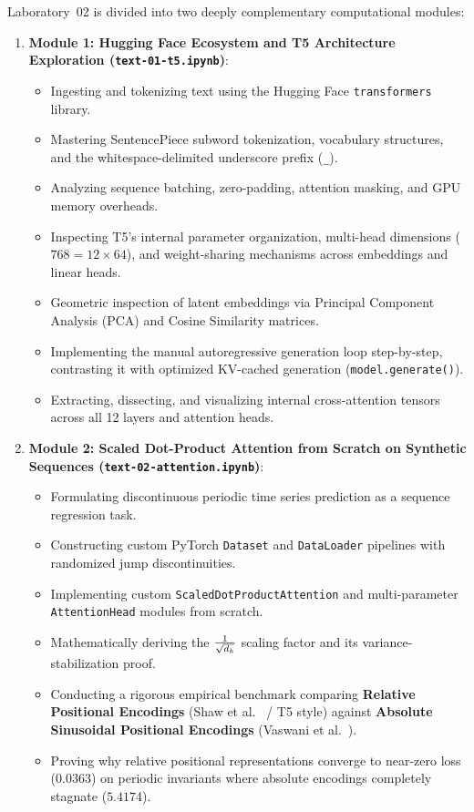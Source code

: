 \documentclass[../labs.tex]{subfiles}
\begin{document}
Laboratory~02 is divided into two deeply complementary computational modules:
\begin{enumerate}
    \item \textbf{Module 1: Hugging Face Ecosystem and T5 Architecture Exploration (\texttt{text-01-t5.ipynb})}:
    \begin{itemize}
        \item Ingesting and tokenizing text using the Hugging Face \texttt{transformers} library.
        \item Mastering SentencePiece subword tokenization, vocabulary structures, and the whitespace-delimited underscore prefix (\texttt{\_}).
        \item Analyzing sequence batching, zero-padding, attention masking, and GPU memory overheads.
        \item Inspecting T5's internal parameter organization, multi-head dimensions ($768 = 12 \times 64$), and weight-sharing mechanisms across embeddings and linear heads.
        \item Geometric inspection of latent embeddings via Principal Component Analysis (PCA) and Cosine Similarity matrices.
        \item Implementing the manual autoregressive generation loop step-by-step, contrasting it with optimized KV-cached generation (\texttt{model.generate()}).
        \item Extracting, dissecting, and visualizing internal cross-attention tensors across all 12 layers and attention heads.
    \end{itemize}
    \item \textbf{Module 2: Scaled Dot-Product Attention from Scratch on Synthetic Sequences (\texttt{text-02-attention.ipynb})}:
    \begin{itemize}
        \item Formulating discontinuous periodic time series prediction as a sequence regression task.
        \item Constructing custom PyTorch \texttt{Dataset} and \texttt{DataLoader} pipelines with randomized jump discontinuities.
        \item Implementing custom \texttt{ScaledDotProductAttention} and multi-parameter \texttt{AttentionHead} modules from scratch.
        \item Mathematically deriving the $\frac{1}{\sqrt{d_k}}$ scaling factor and its variance-stabilization proof.
        \item Conducting a rigorous empirical benchmark comparing \textbf{Relative Positional Encodings} (Shaw et al.~\cite{shaw2018} / T5 style) against \textbf{Absolute Sinusoidal Positional Encodings} (Vaswani et al.~\cite{vaswani2017}).
        \item Proving why relative positional representations converge to near-zero loss ($0.0363$) on periodic invariants where absolute encodings completely stagnate ($5.4174$).
    \end{itemize}
\end{enumerate}
\end{document}

